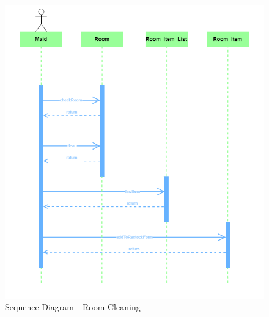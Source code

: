 \begin{figure}[H]
	\centering
	\includegraphics[width=1\textwidth]{Images/Sequence-Room cleaning}
	\caption{Sequence Diagram - Room Cleaning}
	\label{Sequence - Room Cleaning}
\end{figure}

\clearpage
